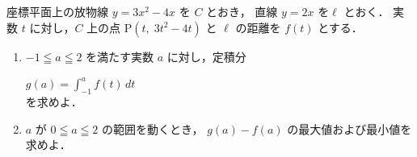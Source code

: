 ﻿\documentclass[../../../uem_mat_tok_q.tex]{subfiles}
\begin{document}
    座標平面上の放物線 $y=3x^2-4x$ を $C$ とおき，%
    直線 $y=2x$ を$ \ell $ とおく．%
    実数 $t$ に対し，$C$ 上の点 $\mathrm{P}(t,\;3t^2-4t)$ と $\ell $ の距離を $f(t)$ とする．

    \begin{enumerate}
        \item $-1\leqq a\leqq 2$ を満たす実数 $a$ に対し，定積分
            
            \myspaceb%
            $\displaystyle%
                g(a)=\int_{-1}^{a}f(t)\,dt%
            $\\
            を求めよ．
        \item $a$ が $0\leqq a\leqq 2$ の範囲を動くとき，%
            $g(a)-f(a)$ の最大値および最小値を求めよ．
    \end{enumerate}
\end{document}
